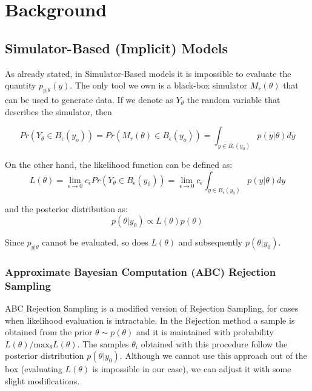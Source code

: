 \documentclass[11pt,twoside]{article}
\numberwithin{Theorem}{section}
\numberwithin{Definition}{section}
\numberwithin{Lemma}{section}
\numberwithin{Algorithm}{section}
\numberwithin{equation}{section}
\begin{document}
\clearpage

\section{Background}
\label{sec:background}

\subsection{Simulator-Based (Implicit) Models}

As already stated, in Simulator-Based models it is impossible to evaluate the quantity $p_{y|\theta}(y)$. The only tool we own is a black-box simulator $M_r(\theta)$ that can be used to generate data. If we denote as $Y_\theta$ the random variable that describes the simulator, then

\begin{equation} 
  Pr(Y_\theta \in B_\epsilon(y_o)) = Pr(M_r(\theta) \in B_\epsilon(y_o)) = \int_{y \in B_\epsilon(y_0)} p(y|\theta)dy
  \end{equation}

  On the other hand, the likelihood function can be defined as:
\begin{equation} \label{eq:likelihood}
  L(\theta) =  \lim_{\epsilon \to 0} c_\epsilon Pr(Y_\theta \in B_\epsilon(y_0)) = \lim_{\epsilon \to 0} c_\epsilon \int_{y \in B_\epsilon(y_0)} p(y|\theta)dy
\end{equation}

and the posterior distribution as:
\begin{equation}
p(\theta|y_0) \propto L(\theta)p(\theta)
\end{equation}

Since $p_{y|\theta}$ cannot be evaluated, so does $L(\theta)$ and subsequently $p(\theta|y_0)$.

\subsubsection{Approximate Bayesian Computation (ABC) Rejection Sampling}

ABC Rejection Sampling is a modified version of Rejection Sampling, for cases when likelihood evaluation is intractable. In the Rejection  method a sample is obtained from the prior $\theta \sim p(\theta)$ and it is maintained with probability $L(\theta)/\text{max}_\theta L(\theta)$. The samples $\theta_i$ obtained with this procedure follow the posterior distribution $p(\theta|y_0)$. Although we cannot use this approach out of the box (evaluating $L(\theta)$ is impossible in our case), we can adjust it with some slight modifications.
\end{document}
